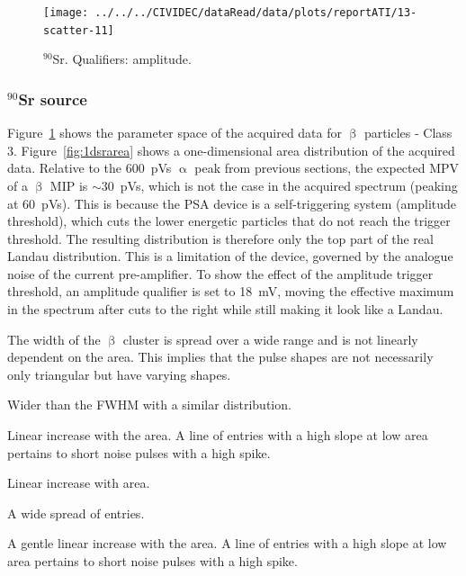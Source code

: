 \clearpage
\begin{figure}[]
\centering
\texttt{[image: ../../../CIVIDEC/dataRead/data/plots/reportATI/13-scatter-11]}
\caption{$^{90}$Sr. Qualifiers: amplitude.}
\label{fig:scattersr}
\end{figure}

\clearpage
\subsubsection{$^{90}$Sr source}
\label{sec:strontsrc}
Figure~\ref{fig:scattersr} shows the parameter space of the acquired data for $\upbeta$ particles - Class 3. Figure~\ref{fig:1dsrarea} shows a one-dimensional area distribution of the acquired data. Relative to the 600~pVs $\upalpha$ peak from previous sections, the expected MPV of a $\upbeta$ MIP is $\sim$30~pVs, which is not the case in the acquired spectrum (peaking at 60~pVs). This is because the PSA device is a self-triggering system (amplitude threshold), which cuts the lower energetic particles that do not reach the trigger threshold. The resulting distribution is therefore only the top part of the real Landau distribution. This is a limitation of the device, governed by the analogue noise of the current pre-amplifier. To show the effect of the amplitude trigger threshold, an amplitude qualifier is set to 18~mV, moving the effective maximum in the spectrum after cuts to the right while still making it look like a Landau.
\begin{description}
\setlength\itemsep{-0.3em}
\item[Width: ] The width of the $\upbeta$ cluster is spread over a wide range and is not linearly dependent on the area. This implies that the pulse shapes are not necessarily only triangular but have varying shapes.
\item[Base width: ] Wider than the FWHM with a similar distribution.
\item[Amplitude: ] Linear increase with the area. A line of entries with a high slope at low area pertains to short noise pulses with a high spike.
\item[Calculated area: ] Linear increase with area.
\item[Base width -- width: ] A wide spread of entries.
\item[Slope: ] A gentle linear increase with the area. A line of entries with a high slope at low area pertains to short noise pulses with a high spike.
\end{description}


